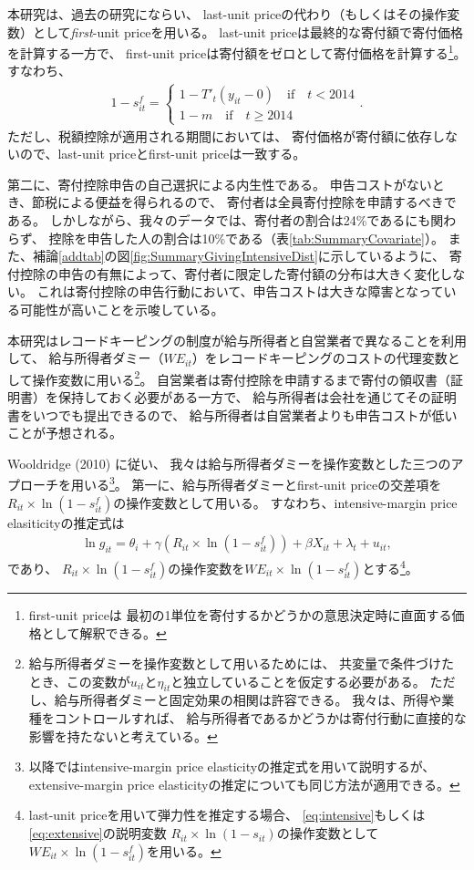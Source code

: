 \documentclass[
  11pt,
  a4paper,
]{article}
\begin{document}
本研究は、過去の研究にならい、
last-unit priceの代わり（もしくはその操作変数）として\emph{first}-unit priceを用いる。
last-unit priceは最終的な寄付額で寄付価格を計算する一方で、
first-unit priceは寄付額をゼロとして寄付価格を計算する\footnote{first-unit priceは
  最初の1単位を寄付するかどうかの意思決定時に直面する価格として解釈できる。}。
すなわち、
\begin{align}
  1 - s^f_{it} =
  \begin{cases}
    1 - T'_t(y_{it} - 0)  \quad\text{if}\quad t < 2014  \\
    1 - m \quad\text{if}\quad t \ge 2014
  \end{cases}.
\end{align}
ただし、税額控除が適用される期間においては、
寄付価格が寄付額に依存しないので、last-unit priceとfirst-unit priceは一致する。

第二に、寄付控除申告の自己選択による内生性である。
申告コストがないとき、節税による便益を得られるので、
寄付者は全員寄付控除を申請するべきである。
しかしながら、我々のデータでは、寄付者の割合は24\%であるにも関わらず、
控除を申告した人の割合は10\%である（表\ref{tab:SummaryCovariate}）。
また、補論\ref{addtab}の図\ref{fig:SummaryGivingIntensiveDist}に示しているように、
寄付控除の申告の有無によって、寄付者に限定した寄付額の分布は大きく変化しない。
これは寄付控除の申告行動において、申告コストは大きな障害となっている可能性が高いことを示唆している。

本研究はレコードキーピングの制度が給与所得者と自営業者で異なることを利用して、
給与所得者ダミー（\(WE_{it}\)）をレコードキーピングのコストの代理変数として操作変数に用いる\footnote{給与所得者ダミーを操作変数として用いるためには、
  共変量で条件づけたとき、この変数が\(u_{it}\)と\(\eta_{it}\)と独立していることを仮定する必要がある。
  ただし、給与所得者ダミーと固定効果の相関は許容できる。
  我々は、所得や業種をコントロールすれば、
  給与所得者であるかどうかは寄付行動に直接的な影響を持たないと考えている。}。
自営業者は寄付控除を申請するまで寄付の領収書（証明書）を保持しておく必要がある一方で、
給与所得者は会社を通じてその証明書をいつでも提出できるので、
給与所得者は自営業者よりも申告コストが低いことが予想される。

Wooldridge (2010) に従い、
我々は給与所得者ダミーを操作変数とした三つのアプローチを用いる\footnote{以降ではintensive-margin price elasticityの推定式を用いて説明するが、
  extensive-margin price elasticityの推定についても同じ方法が適用できる。}。
第一に、給与所得者ダミーとfirst-unit priceの交差項を
\(R_{it} \times \ln (1 - s^f_{it})\)の操作変数として用いる。
すなわち、intensive-margin price elasiticityの推定式は
\begin{align}
  \ln g_{it} = \theta_i + \gamma (R_{it} \times \ln (1 - s^f_{it}))
    + \beta X_{it} + \lambda_t + u_{it}, \label{eq:intensive2}
\end{align}
であり、
\(R_{it} \times \ln (1 - s^f_{it})\)の操作変数を\(WE_{it} \times \ln(1 - s^f_{it})\)とする\footnote{last-unit priceを用いて弾力性を推定する場合、
  \eqref{eq:intensive}もしくは\eqref{eq:extensive}の説明変数
  \(R_{it} \times \ln (1 - s_{it})\)の操作変数として
  \(WE_{it} \times \ln(1 - s^f_{it})\)を用いる。}。
\end{document}
